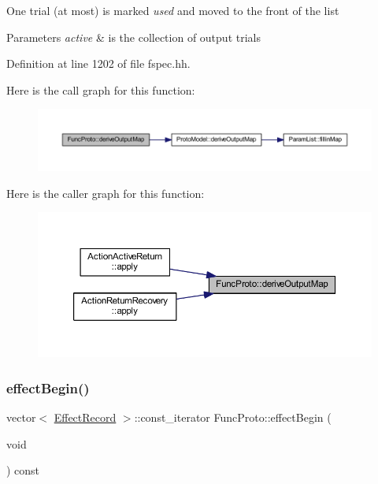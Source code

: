 One trial (at most) is marked {\itshape used} and moved to the front of the list 
\begin{DoxyParams}{Parameters}
{\em active} & is the collection of output trials \\
\hline
\end{DoxyParams}


Definition at line 1202 of file fspec.\+hh.

Here is the call graph for this function\+:
\nopagebreak
\begin{figure}[H]
\begin{center}
\leavevmode
\includegraphics[width=350pt]{class_func_proto_a750224dcda509d76d01e3f45a3d38117_cgraph}
\end{center}
\end{figure}
Here is the caller graph for this function\+:
\nopagebreak
\begin{figure}[H]
\begin{center}
\leavevmode
\includegraphics[width=350pt]{class_func_proto_a750224dcda509d76d01e3f45a3d38117_icgraph}
\end{center}
\end{figure}
\mbox{\label{class_func_proto_a802de184a6ac675b8f4bb4c4cb47a194}} 
\subsubsection{\texorpdfstring{effectBegin()}{effectBegin()}}
{\footnotesize\ttfamily vector$<$ \mbox{\hyperlink{class_effect_record}{Effect\+Record}} $>$\+::const\+\_\+iterator Func\+Proto\+::effect\+Begin (\begin{DoxyParamCaption}\item[{void}]{ }\end{DoxyParamCaption}) const}



